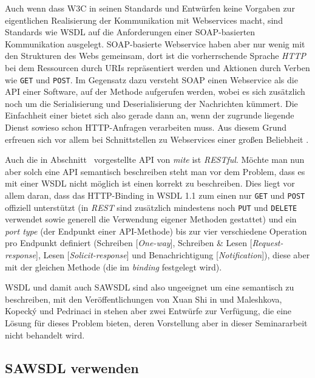 Auch wenn dass \ac{W3C} in seinen Standards und Entwürfen keine Vorgaben zur eigentlichen Realisierung der Kommunikation mit Webservices macht, sind Standards wie \ac{WSDL} auf die Anforderungen einer \ac{SOAP}-basierten Kommunikation ausgelegt. \ac{SOAP}-basierte Webservice haben aber nur wenig mit den Strukturen des Webs gemeinsam, dort ist die vorherrschende Sprache \emph{HTTP} bei dem Ressourcen durch URIs repräsentiert werden und Aktionen durch Verben wie \texttt{GET} und \texttt{POST}. Im Gegensatz dazu versteht \ac{SOAP} einen Webservice als die \ac{API} einer Software, auf der Methode aufgerufen werden, wobei es sich zusätzlich noch um die Serialisierung und Deserialisierung der Nachrichten kümmert. Die Einfachheit einer \restapi bietet sich also gerade dann an, wenn der zugrunde liegende Dienst sowieso schon HTTP-Anfragen verarbeiten muss. Aus diesem Grund erfreuen sich \restapis vor allem bei Schnittstellen zu Webservices einer großen Beliebheit \cite[S.18]{xn-sss}.

Auch die in Abschnitt~\pageref{l:einleitung} vorgestellte \ac{API} von \emph{mite} ist \emph{RESTful}. Möchte man nun aber solch eine \ac{API} semantisch beschreiben steht man vor dem Problem, dass es mit einer \ac{WSDL} nicht möglich ist einen \restapi korrekt zu beschreiben. Dies liegt vor allem daran, dass das HTTP-Binding in \ac{WSDL} 1.1 zum einen nur \texttt{GET} und \texttt{POST} offiziell unterstützt (in \emph{REST} sind zusätzlich mindestens noch \texttt{PUT} und \texttt{DELETE} verwendet sowie generell die Verwendung eigener Methoden gestattet) und ein \emph{port type} (der Endpunkt einer API-Methode) bis zur vier verschiedene Operation pro Endpunkt definiert (Schreiben [\emph{One-way}], Schreiben \& Lesen [\emph{Request-response}], Lesen [\emph{Solicit-response}] und Benachrichtigung [\emph{Notification}]), diese aber mit der gleichen Methode (die im \emph{binding} festgelegt wird).

\ac{WSDL} und damit auch \ac{SAWSDL} sind also ungeeignet um eine \restapi semantisch zu beschreiben, mit den Veröffentlichungen von Xuan Shi in \cite{xn-sss} und Maleshkova, Kopeck\'{y} und Pedrinaci in \cite{ma-sawslrest} stehen aber zwei Entwürfe zur Verfügung, die eine Lösung für dieses Problem bieten, deren Vorstellung aber in dieser Seminararbeit nicht behandelt wird.

\subsection{\acs{SAWSDL} verwenden}

